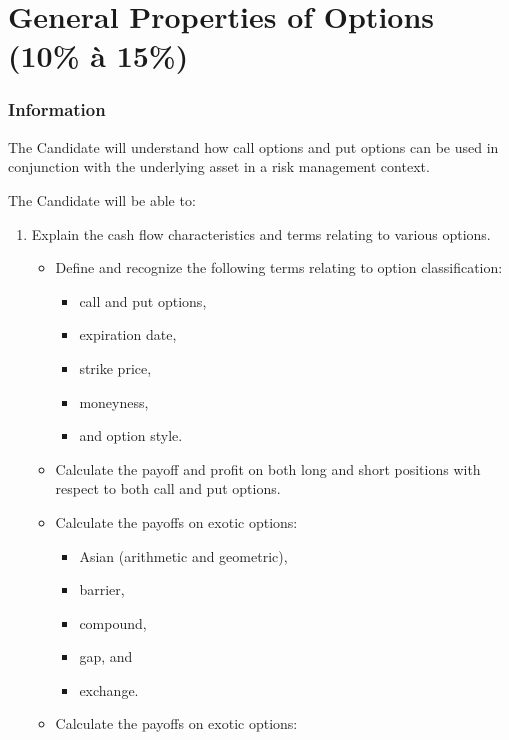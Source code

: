 \chapter[General Properties of Options]{General Properties of Options (10\% à 15\%)}

\subsection{Information}

\begin{distributions}[Objective]
The Candidate will understand how call options and put options can be used in conjunction with the underlying asset in a risk management context.
\end{distributions}

\begin{outcomes}
The Candidate will be able to:
\begin{enumerate}[label = \alph*)]
	\item	Explain the cash flow characteristics and terms relating to various options.
		\begin{knowledge}[]
		\begin{itemize}
		\item	Define and recognize the following terms relating to option classification: 
			\begin{itemize}
			\item	call and put options, 
			\item	expiration date, 
			\item	strike price,
			\item	moneyness, 
			\item	and option style.
			\end{itemize}
		\item	Calculate the payoff and profit on both long and short positions with respect to both call and put options.
		\item	Calculate the payoffs on exotic options: 
			\begin{itemize}
			\item	Asian (arithmetic and geometric), 
			\item	barrier, 
			\item	compound, 
			\item	gap, and 
			\item	exchange.
			\end{itemize}
		\item	Calculate the payoffs on exotic options: 

\end{itemize}
\end{knowledge}
\end{enumerate}
\end{outcomes}
